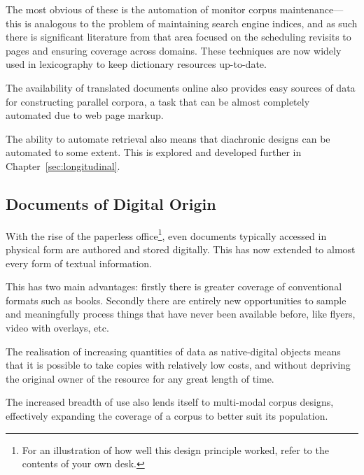 The most obvious of these is the automation of monitor corpus maintenance---this is analogous to the problem of maintaining search engine indices, and as such there is significant literature from that area focused on the scheduling revisits to pages and ensuring coverage across domains.  These techniques are now widely used in lexicography to keep dictionary resources up-to-date\cite{meunier2011taste}.

The availability of translated documents online also provides easy sources of data for constructing parallel corpora, a task that can be almost completely automated due to web page markup\cite{resnik2003web}.

The ability to automate retrieval also means that diachronic designs can be automated to some extent.  This is explored and developed further in Chapter~\ref{sec:longitudinal}.







\subsection{Documents of Digital Origin}
With the rise of the paperless office\footnote{For an illustration of how well this design principle worked, refer to the contents of your own desk.}, even documents typically accessed in physical form are authored and stored digitally.  This has now extended to almost every form of textual information.

This has two main advantages: firstly there is greater coverage of conventional formats such as books.  Secondly there are entirely new opportunities to sample and meaningfully process things that have never been available before, like flyers, video with overlays, etc.

The realisation of increasing quantities of data as native-digital objects means that it is possible to take copies with relatively low costs, and without depriving the original owner of the resource for any great length of time.

The increased breadth of use also lends itself to multi-modal corpus designs, effectively expanding the coverage of a corpus to better suit its population.


